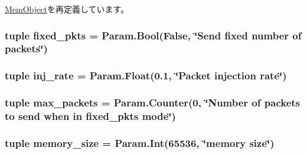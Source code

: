 \hyperlink{classMemObject_1_1MemObject_a17da7064bc5c518791f0c891eff05fda}{MemObject}を再定義しています。\hypertarget{classNetworkTest_1_1NetworkTest_a566d9159b2e5fa3130f5f62aabeb7915}{
\subsubsection[{fixed\_\-pkts}]{\setlength{\rightskip}{0pt plus 5cm}tuple {\bf fixed\_\-pkts} = Param.Bool(False, \char`\"{}Send fixed number of packets\char`\"{})}}
\label{classNetworkTest_1_1NetworkTest_a566d9159b2e5fa3130f5f62aabeb7915}
\hypertarget{classNetworkTest_1_1NetworkTest_ae679ac2a8d1c109f4d2e37e447c4ebb5}{
\subsubsection[{inj\_\-rate}]{\setlength{\rightskip}{0pt plus 5cm}tuple {\bf inj\_\-rate} = Param.Float(0.1, \char`\"{}Packet injection rate\char`\"{})}}
\label{classNetworkTest_1_1NetworkTest_ae679ac2a8d1c109f4d2e37e447c4ebb5}
\hypertarget{classNetworkTest_1_1NetworkTest_a7896be157fa4c5c1636e7819cae0f2cc}{
\subsubsection[{max\_\-packets}]{\setlength{\rightskip}{0pt plus 5cm}tuple {\bf max\_\-packets} = {\bf Param.Counter}(0, \char`\"{}Number of packets to send when in {\bf fixed\_\-pkts} mode\char`\"{})}}
\label{classNetworkTest_1_1NetworkTest_a7896be157fa4c5c1636e7819cae0f2cc}
\hypertarget{classNetworkTest_1_1NetworkTest_a1cf2f09c6d685e8208dc29b8d059c7ae}{
\subsubsection[{memory\_\-size}]{\setlength{\rightskip}{0pt plus 5cm}tuple {\bf memory\_\-size} = Param.Int(65536, \char`\"{}memory {\bf size}\char`\"{})}}
